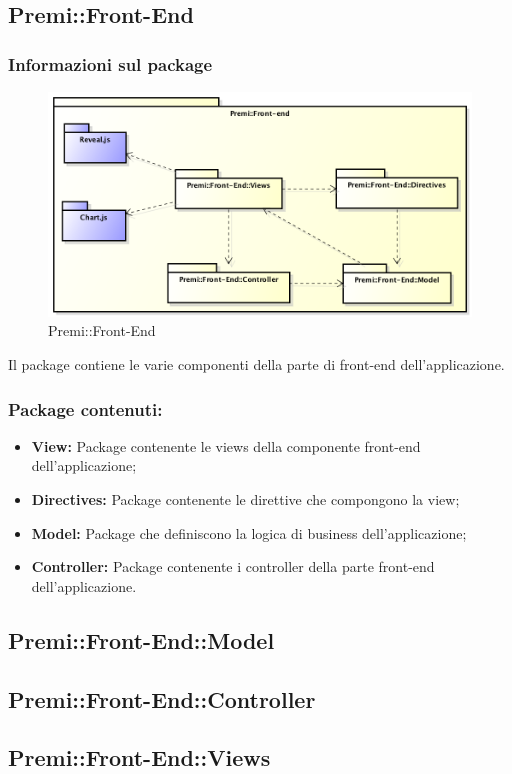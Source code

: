 \subsection{Premi::Front-End}
	\subsubsection*{Informazioni sul package}
		\begin{figure}[h]
			\centering
			\includegraphics[width=\linewidth]{img/front-end_package}
			\caption[Premi::Front-End]{Premi::Front-End}
		\end{figure}
		Il package contiene le varie componenti della parte di \gls{front-end} dell'applicazione.

		\subsubsection*{Package contenuti:}
			\begin{itemize}
				\item \textbf{View:} Package contenente le views della componente \gls{front-end} dell'applicazione;
				\item \textbf{Directives:} Package contenente le direttive che compongono la view;
				\item \textbf{Model:} Package che definiscono la logica di business dell'applicazione;
				\item \textbf{Controller:} Package contenente i controller della parte \gls{front-end} dell'applicazione.
			\end{itemize}

		\subsection{Premi::Front-End::Model}
			

		\subsection{Premi::Front-End::Controller}
			
			\newpage

		\subsection{Premi::Front-End::Views}
			
			\newpage
